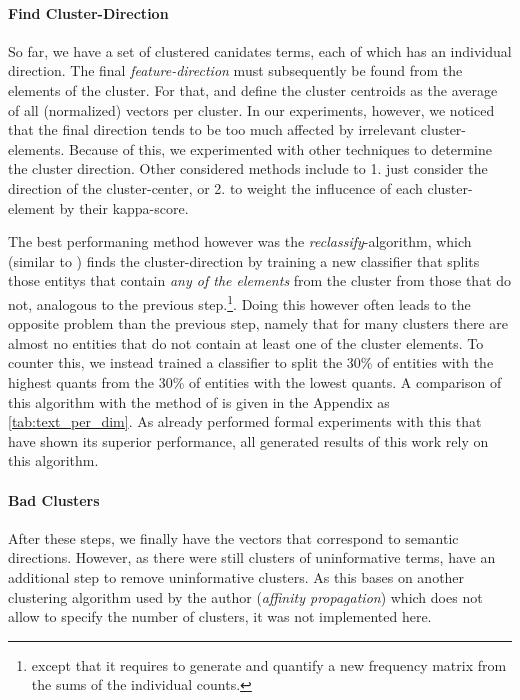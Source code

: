 \paragraph{Find Cluster-Direction}

So far, we have a set of clustered canidates terms, each of which has an individual direction. The final \textit{feature-direction} must subsequently be found from the elements of the cluster. For that, \cite{Derrac2015} and \cite{Ager2018} define the cluster centroids as the average of all (normalized) vectors per cluster. In our experiments, however, we noticed that the final direction tends to be too much affected by irrelevant cluster-elements. Because of this, we experimented with other techniques to determine the cluster direction. Other considered methods include \eg to 1. just consider the direction of the cluster-center, or 2. to weight the influcence of each cluster-element by their kappa-score.

The best performaning method however was the \textit{reclassify}-algorithm, which (similar to \cite{Alshaikh2020}) finds the cluster-direction by training a new classifier that splits those \glspl{entity} that contain \textit{any of the elements} from the cluster from those that do not, analogous to the previous step.\footnote{except that it requires to generate and quantify a new frequency matrix from the sums of the individual counts.}. Doing this however often leads to the opposite problem than the previous step, namely that for many clusters there are almost no entities that do not contain at least one of the cluster elements. To counter this, we instead trained a classifier to split the 30\% of entities with the highest \glspl{quant} from the 30\% of entities with the lowest \glspl{quant}. A comparison of this algorithm with the method of \cite{Derrac2015} is given in the Appendix as \autoref{tab:text_per_dim}. As \cite{Alshaikh2020} already performed formal experiments with this that have shown its superior performance, all generated results of this work rely on this algorithm. 

\paragraph{Bad Clusters}

After these steps, we finally have the vectors that correspond to semantic directions. However, as there were still clusters of uninformative terms, \textcite{Alshaikh2020} have an additional step to remove uninformative clusters. As this bases on another clustering algorithm used by the author (\textit{affinity propagation}) which does not allow to specify the number of clusters, it was not implemented here.

